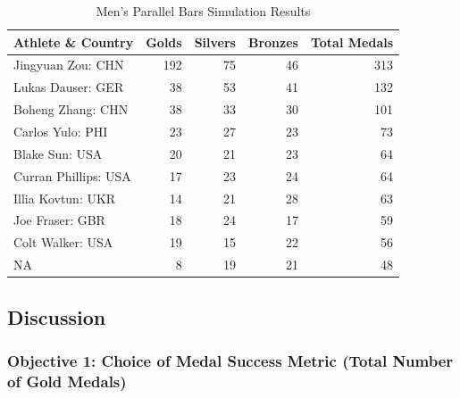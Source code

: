 \documentclass[
  letterpaper,
  DIV=11,
  numbers=noendperiod]{scrartcl}
\begin{document}
\begin{table}[H]

\caption{Men's Parallel Bars Simulation Results }
\centering
\fontsize{8}{10}\selectfont
\begin{tabular}[t]{l|r|r|r|r}
\hline
Athlete \& Country & Golds & Silvers & Bronzes & Total Medals\\
\hline
Jingyuan Zou: CHN & 192 & 75 & 46 & 313\\
\hline
Lukas Dauser: GER & 38 & 53 & 41 & 132\\
\hline
Boheng Zhang: CHN & 38 & 33 & 30 & 101\\
\hline
Carlos Yulo: PHI & 23 & 27 & 23 & 73\\
\hline
Blake Sun: USA & 20 & 21 & 23 & 64\\
\hline
Curran Phillips: USA & 17 & 23 & 24 & 64\\
\hline
Illia Kovtun: UKR & 14 & 21 & 28 & 63\\
\hline
Joe Fraser: GBR & 18 & 24 & 17 & 59\\
\hline
Colt Walker: USA & 19 & 15 & 22 & 56\\
\hline
NA & 8 & 19 & 21 & 48\\
\hline
\end{tabular}
\end{table}

\hypertarget{discussion}{%
\subsection{Discussion}\label{discussion}}

\hypertarget{objective-1-choice-of-medal-success-metric-total-number-of-gold-medals}{%
\subsubsection{Objective 1: Choice of Medal Success Metric (Total Number
of Gold
Medals)}\label{objective-1-choice-of-medal-success-metric-total-number-of-gold-medals}}
\end{document}
